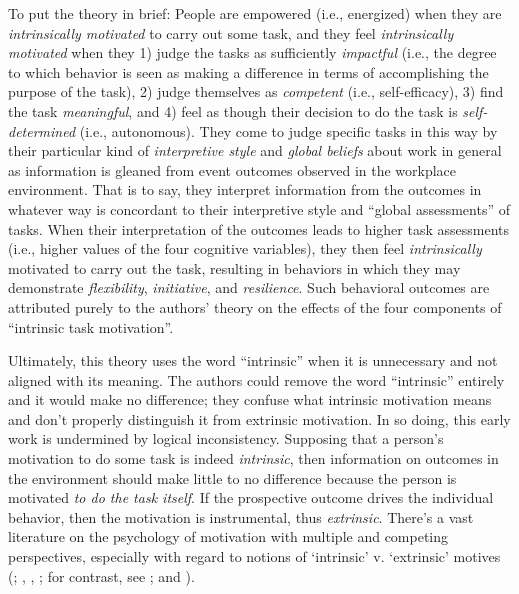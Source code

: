 \documentclass[
  11pt,
  a4paper,
]{article}
\begin{document}
To put the theory in brief: People are empowered (i.e., energized) when
they are \emph{intrinsically motivated} to carry out some task, and they
feel \emph{intrinsically motivated} when they 1) judge the tasks as
sufficiently \emph{impactful} (i.e., the degree to which behavior is
seen as making a difference in terms of accomplishing the purpose of the
task), 2) judge themselves as \emph{competent} (i.e., self-efficacy), 3)
find the task \emph{meaningful}, and 4) feel as though their decision to
do the task is \emph{self-determined} (i.e., autonomous). They come to
judge specific tasks in this way by their particular kind of
\emph{interpretive style} and \emph{global beliefs} about work in
general as information is gleaned from event outcomes observed in the
workplace environment. That is to say, they interpret information from
the outcomes in whatever way is concordant to their interpretive style
and ``global assessments'' of tasks. When their interpretation of the
outcomes leads to higher task assessments (i.e., higher values of the
four cognitive variables), they then feel \emph{intrinsically} motivated
to carry out the task, resulting in behaviors in which they may
demonstrate \emph{flexibility}, \emph{initiative}, and
\emph{resilience}. Such behavioral outcomes are attributed purely to the
authors' theory on the effects of the four components of ``intrinsic
task motivation''.

Ultimately, this theory uses the word ``intrinsic'' when it is
unnecessary and not aligned with its meaning. The authors could remove
the word ``intrinsic'' entirely and it would make no difference; they
confuse what intrinsic motivation means and don't properly distinguish
it from extrinsic motivation. In so doing, this early work is undermined
by logical inconsistency. Supposing that a person's motivation to do
some task is indeed \emph{intrinsic}, then information on outcomes in
the environment should make little to no difference because the person
is motivated \emph{to do the task itself}. If the prospective outcome
drives the individual behavior, then the motivation is instrumental,
thus \emph{extrinsic}. There's a vast literature on the psychology of
motivation with multiple and competing perspectives, especially with
regard to notions of `intrinsic' v. `extrinsic' motives
(;
,
, ; for
contrast, see ; and
).
\end{document}
